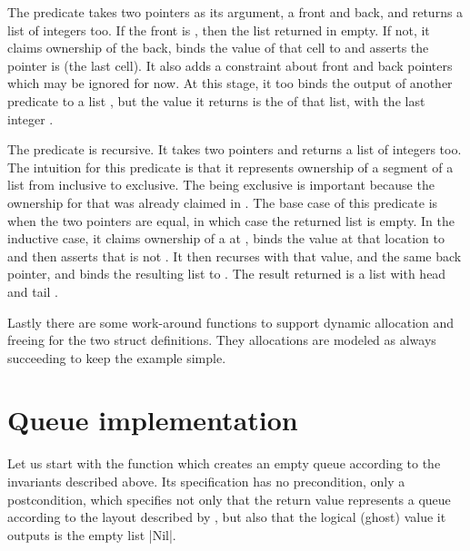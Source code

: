 
The predicate  takes two pointers as its argument, a front
and back, and returns a list of integers too. If the front is ,
then the list returned in empty. If not, it claims ownership of the back, binds
the value of that cell to  and asserts the 
pointer is  (the last cell). It also adds a constraint about
front and back pointers which may be ignored for now. At this stage, it too
binds the output of another predicate to a list , but the value it
returns is the  of that list, with the last integer
.


The predicate  is recursive. It takes two pointers and
returns a list of integers too. The intuition for this predicate is that it
represents ownership of a segment of a list from  inclusive to
 exclusive. The  being exclusive is important
because the ownership for that was already claimed in . The
base case of this predicate is when the two pointers are equal, in which case
the returned list is empty. In the inductive case, it claims ownership of a
 at , binds the value at that location
to  and then asserts that  is not .
It then recurses with that value, and the same back pointer, and binds the
resulting list to . The result returned is a list with head
 and tail .


Lastly there are some work-around functions to support dynamic allocation and
freeing for the two struct definitions. They allocations are modeled as always
succeeding to keep the example simple.


\section{Queue implementation}

Let us start with the function which creates an empty queue according to the
invariants described above. Its specification has no precondition, only a
postcondition, which specifies not only that the return value represents a
queue according to the layout described by , but also
that the logical (ghost) value it outputs is the empty list \cninline|Nil{}|.


